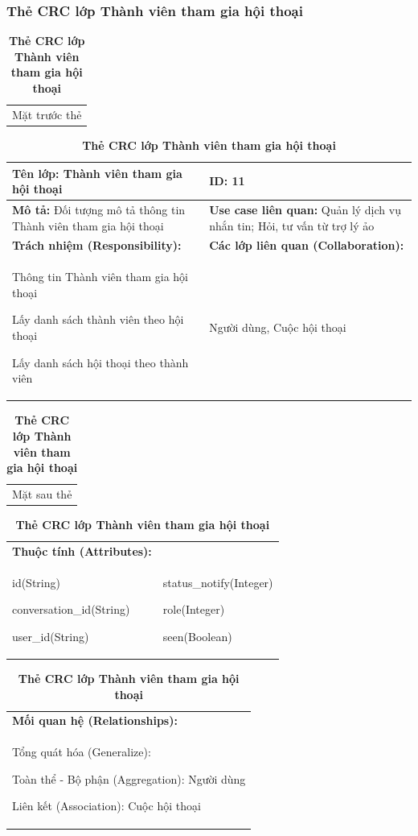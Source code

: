   \subsubsection{Thẻ CRC lớp Thành viên tham gia hội thoại}
  \begin{table}[H]
    \caption{\bfseries \fontsize{12pt}{0pt}\selectfont Thẻ CRC lớp Thành viên tham gia hội thoại}
    \centering
    \begin{tabularx}{0.9\textwidth}{X}
      Mặt trước thẻ
    \end{tabularx}
    \begin{tabularx}{0.9\textwidth}{|X|X|}
      \hline
      \textbf{Tên lớp:} Thành viên tham gia hội thoại & \textbf{ID:} 11 \\
      \hline
      \textbf{Mô tả:} Đối tượng mô tả thông tin Thành viên tham gia hội thoại & \textbf{Use case liên quan:} Quản lý dịch vụ nhắn tin; Hỏi, tư vấn từ trợ lý ảo \\
      \hline
      \textbf{Trách nhiệm (Responsibility):} & \textbf{Các lớp liên quan (Collaboration):} \\
      Thông tin Thành viên tham gia hội thoại

      Lấy danh sách thành viên theo hội thoại

      Lấy danh sách hội thoại theo thành viên
      & 
      Người dùng, Cuộc hội thoại 
      \\
      \hline
    \end{tabularx}
    \begin{tabularx}{0.9\textwidth}{X}
      Mặt sau thẻ
    \end{tabularx}
    \begin{tabularx}{0.9\textwidth}{|X|X|}
      \hline
      \textbf{Thuộc tính (Attributes):} & \\
      id(String) 
      
      conversation\_id(String)

      user\_id(String)
      &
      status\_notify(Integer)

      role(Integer)

      seen(Boolean)
      \\
      \hline
    \end{tabularx}
    \begin{tabularx}{0.9\textwidth}{|X|}
      \textbf{Mối quan hệ (Relationships):} \\
      Tổng quát hóa (Generalize):  

      Toàn thể - Bộ phận (Aggregation): Người dùng
      
      Liên kết (Association): Cuộc hội thoại
      \\
      \hline
    \end{tabularx}
  \end{table}

